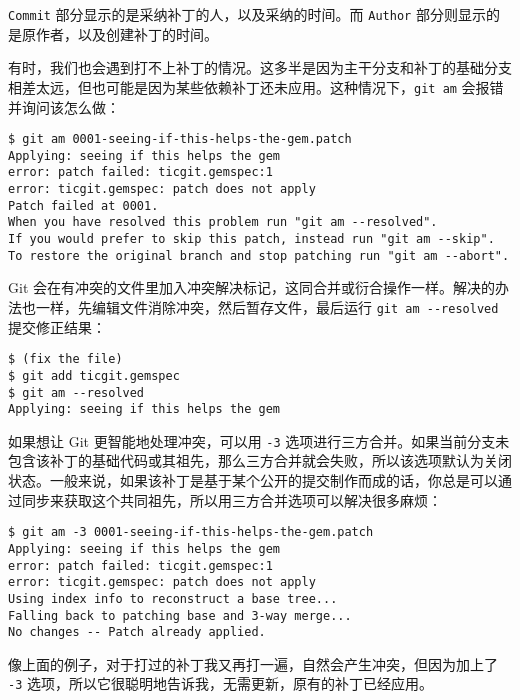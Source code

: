 \documentclass[a4paper]{book}
\begin{document}
\texttt{Commit} 部分显示的是采纳补丁的人，以及采纳的时间。而 \texttt{Author} 部分则显示的是原作者，以及创建补丁的时间。

有时，我们也会遇到打不上补丁的情况。这多半是因为主干分支和补丁的基础分支相差太远，但也可能是因为某些依赖补丁还未应用。这种情况下，\texttt{git am} 会报错并询问该怎么做：

\begin{shaded}\begin{verbatim}
$ git am 0001-seeing-if-this-helps-the-gem.patch 
Applying: seeing if this helps the gem
error: patch failed: ticgit.gemspec:1
error: ticgit.gemspec: patch does not apply
Patch failed at 0001.
When you have resolved this problem run "git am --resolved".
If you would prefer to skip this patch, instead run "git am --skip".
To restore the original branch and stop patching run "git am --abort".
\end{verbatim}\end{shaded}

Git 会在有冲突的文件里加入冲突解决标记，这同合并或衍合操作一样。解决的办法也一样，先编辑文件消除冲突，然后暂存文件，最后运行 \texttt{git am -{}-resolved} 提交修正结果：

\begin{shaded}\begin{verbatim}
$ (fix the file)
$ git add ticgit.gemspec 
$ git am --resolved
Applying: seeing if this helps the gem
\end{verbatim}\end{shaded}

如果想让 Git 更智能地处理冲突，可以用 \texttt{-3} 选项进行三方合并。如果当前分支未包含该补丁的基础代码或其祖先，那么三方合并就会失败，所以该选项默认为关闭状态。一般来说，如果该补丁是基于某个公开的提交制作而成的话，你总是可以通过同步来获取这个共同祖先，所以用三方合并选项可以解决很多麻烦：

\begin{shaded}\begin{verbatim}
$ git am -3 0001-seeing-if-this-helps-the-gem.patch 
Applying: seeing if this helps the gem
error: patch failed: ticgit.gemspec:1
error: ticgit.gemspec: patch does not apply
Using index info to reconstruct a base tree...
Falling back to patching base and 3-way merge...
No changes -- Patch already applied.
\end{verbatim}\end{shaded}

像上面的例子，对于打过的补丁我又再打一遍，自然会产生冲突，但因为加上了 \texttt{-3} 选项，所以它很聪明地告诉我，无需更新，原有的补丁已经应用。
\end{document}
